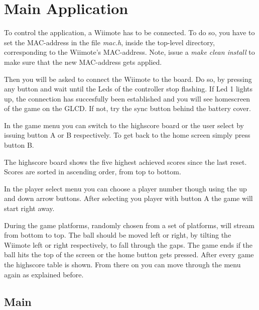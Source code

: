 \documentclass[12pt,a4paper,titlepage,oneside]{article}
\begin{document}
\newpage

\section{Main Application}

To control the application, a Wiimote has to be connected. To do so, you
have to set the MAC-address in the file \emph{mac.h}, inside the top-level
directory, corresponding to the Wiimote's MAC-address. Note, issue a \emph{make
clean install} to make sure that the new MAC-address gets applied.

\noindent
Then you will be asked to connect the Wiimote to the board. Do so, by pressing
any button and wait until the Leds of the controller stop flashing. If Led 1 
lights up, the connection has succesfully been established and you will see 
homescreen of the game on the GLCD. If not, try the sync button behind the
battery cover. 

\noindent
In the game menu you can switch to the highscore board or the user select by
issuing button A or B respectively. To get back to the home screen simply press
button B. 

\noindent
The highscore board shows the five highest achieved scores since the last reset. 
Scores are sorted in ascending order, from top to bottom.

\noindent
In the player select menu you can choose a player number though using the up and 
down arrow buttons. After selecting you player with button A the game will start 
right away.

\noindent
During the game platforms, randomly chosen from a set of platforms, will stream
from bottom to top. The ball should be moved left or right, by tilting the 
Wiimote left or right respectively, to fall through the gaps. The game ends if
the ball hits the top of the screen or the home button gets pressed. After every
game the highscore table is shown. From there on you can move through the menu
again as explained before.

\subsection{Main}
\end{document}
